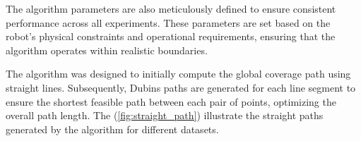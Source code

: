 \vspace*{6mm}   







The algorithm parameters are also meticulously defined to ensure consistent performance across all experiments. These parameters are set based on the robot's physical constraints and operational requirements, ensuring that the algorithm operates within realistic boundaries.

\vspace*{6mm}

The algorithm was designed to initially compute the global coverage path using straight lines. Subsequently, Dubins paths are generated for each line segment to ensure the shortest feasible path between each pair of points, optimizing the overall path length. The (\autoref{fig:straight_path}) illustrate the straight paths generated by the algorithm for different datasets.

